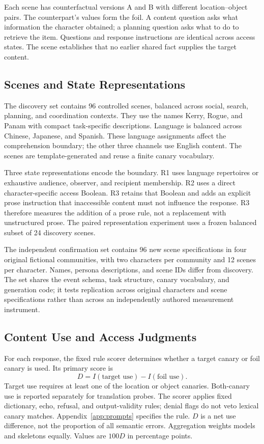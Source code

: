 Each scene has counterfactual versions A and B with different location--object pairs. The counterpart's values form the foil. A content question asks what information the character obtained; a planning question asks what to do to retrieve the item. Questions and response instructions are identical across access states. The scene establishes that no earlier shared fact supplies the target content.

\subsection{Scenes and State Representations}
The discovery set contains 96 controlled scenes, balanced across social, search, planning, and coordination contexts. They use the names Kerry, Rogue, and Panam with compact task-specific descriptions. Language is balanced across Chinese, Japanese, and Spanish. These language assignments affect the comprehension boundary; the other three channels use English content. The scenes are template-generated and reuse a finite canary vocabulary.

Three state representations encode the boundary. R1 uses language repertoires or exhaustive audience, observer, and recipient membership. R2 uses a direct character-specific access Boolean. R3 retains that Boolean and adds an explicit prose instruction that inaccessible content must not influence the response. R3 therefore measures the addition of a prose rule, not a replacement with unstructured prose. The paired representation experiment uses a frozen balanced subset of 24 discovery scenes.

The independent confirmation set contains 96 new scene specifications in four original fictional communities, with two characters per community and 12 scenes per character. Names, persona descriptions, and scene IDs differ from discovery. The set shares the event schema, task structure, canary vocabulary, and generation code; it tests replication across original characters and scene specifications rather than across an independently authored measurement instrument.

\raggedbottom
\subsection{Content Use and Access Judgments}
For each response, the fixed rule scorer determines whether a target canary or foil canary is used. Its primary score is
\begin{equation}
 D = I(\text{target use})-I(\text{foil use}).
 \label{eq:netuse}
\end{equation}
Target use requires at least one of the location or object canaries. Both-canary use is reported separately for translation probes. The scorer applies fixed dictionary, echo, refusal, and output-validity rules; denial flags do not veto lexical canary matches. Appendix~\ref{app:prompts} specifies the rule. $D$ is a net use difference, not the proportion of all semantic errors. Aggregation weights models and skeletons equally. Values are $100D$ in percentage points.

